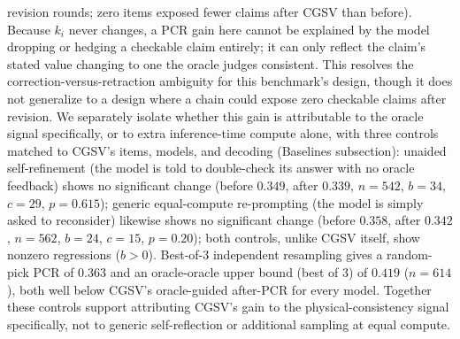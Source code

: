 \documentclass[pdflatex,sn-nature]{sn-jnl}
\begin{document}
revision rounds; zero items exposed fewer claims after CGSV than before). Because $k_i$
never changes, a PCR gain here cannot be explained by the model dropping or hedging a
checkable claim entirely; it can only reflect the claim's stated value changing to one the
oracle judges consistent. This resolves the correction-versus-retraction ambiguity for
this benchmark's design, though it does not generalize to a design where a chain could
expose zero checkable claims after revision. We separately isolate whether this gain is
attributable to the oracle signal specifically, or to extra inference-time compute alone,
with three controls matched to CGSV's items, models, and decoding
(Baselines subsection): unaided self-refinement (the model is told to double-check its
answer with no oracle feedback) shows no significant change (before $0.349$, after $0.339$, $n=542$, $b=34$, $c=29$, $p=0.615$);
generic equal-compute re-prompting (the model is simply asked to reconsider) likewise shows
no significant change (before $0.358$, after $0.342$, $n=562$, $b=24$, $c=15$, $p=0.20$); both controls, unlike CGSV
itself, show nonzero regressions ($b>0$). Best-of-3 independent resampling gives a
random-pick PCR of $0.363$ and an oracle-oracle upper bound (best of 3) of $0.419$
($n=614$), both well below CGSV's oracle-guided after-PCR for every model. Together these
controls support attributing CGSV's gain to the physical-consistency signal specifically,
not to generic self-reflection or additional sampling at equal compute.
\end{document}
